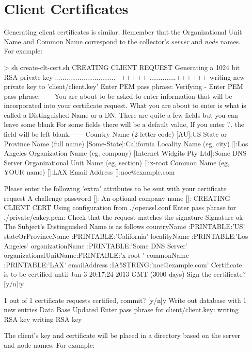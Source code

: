 \documentclass{report}
\begin{document}
\section{Client Certificates}

Generating client certificates is similar.  Remember that
the Organizational Unit Name and Common Name correspond to the
collector's {\em server\/} and {\em node\/} names.   For example:

\begin{MyVerbatim}
> sh create-clt-cert.sh
CREATING CLIENT REQUEST
Generating a 1024 bit RSA private key
................................++++++
..............++++++
writing new private key to 'client/client.key'
Enter PEM pass phrase:
Verifying - Enter PEM pass phrase:
-----
You are about to be asked to enter information that will be incorporated
into your certificate request.
What you are about to enter is what is called a Distinguished Name or a DN.
There are quite a few fields but you can leave some blank
For some fields there will be a default value,
If you enter '.', the field will be left blank.
-----
Country Name (2 letter code) [AU]:US
State or Province Name (full name) [Some-State]:California
Locality Name (eg, city) []:Los Angeles
Organization Name (eg, company) [Internet Widgits Pty Ltd]:Some DNS Server
Organizational Unit Name (eg, section) []:x-root  
Common Name (eg, YOUR name) []:LAX
Email Address []:noc@example.com

Please enter the following 'extra' attributes
to be sent with your certificate request
A challenge password []:
An optional company name []:
CREATING CLIENT CERT
Using configuration from ./openssl.conf
Enter pass phrase for ./private/cakey.pem:
Check that the request matches the signature
Signature ok
The Subject's Distinguished Name is as follows
countryName           :PRINTABLE:'US'
stateOrProvinceName   :PRINTABLE:'California'
localityName          :PRINTABLE:'Los Angeles'
organizationName      :PRINTABLE:'Some DNS Server'
organizationalUnitName:PRINTABLE:'x-root  '
commonName            :PRINTABLE:'LAX'
emailAddress          :IA5STRING:'noc@example.com'
Certificate is to be certified until Jun  3 20:17:24 2013 GMT (3000 days)
Sign the certificate? [y/n]:y 


1 out of 1 certificate requests certified, commit? [y/n]y
Write out database with 1 new entries
Data Base Updated
Enter pass phrase for client/client.key:
writing RSA key
writing RSA key
\end{MyVerbatim}

The client's key and certificate will be placed in a directory
based on the server and node names.  For example:
\end{document}

